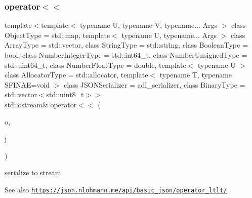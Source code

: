 \subsubsection{\texorpdfstring{operator$<$$<$}{operator<<}\hspace{0.1cm}{\footnotesize\ttfamily [1/2]}}
{\footnotesize\ttfamily template$<$template$<$ typename U, typename V, typename... Args $>$ class Object\+Type = std\+::map, template$<$ typename U, typename... Args $>$ class Array\+Type = std\+::vector, class String\+Type  = std\+::string, class Boolean\+Type  = bool, class Number\+Integer\+Type  = std\+::int64\+\_\+t, class Number\+Unsigned\+Type  = std\+::uint64\+\_\+t, class Number\+Float\+Type  = double, template$<$ typename U $>$ class Allocator\+Type = std\+::allocator, template$<$ typename T, typename S\+F\+I\+N\+A\+E=void $>$ class J\+S\+O\+N\+Serializer = adl\+\_\+serializer, class Binary\+Type  = std\+::vector$<$std\+::uint8\+\_\+t$>$$>$ \\
std\+::ostream\& operator$<$$<$ (\begin{DoxyParamCaption}\item[{std\+::ostream \&}]{o,  }\item[{const \hyperlink{classnlohmann_1_1basic__json}{basic\+\_\+json}$<$ Object\+Type, Array\+Type, String\+Type, Boolean\+Type, Number\+Integer\+Type, Number\+Unsigned\+Type, Number\+Float\+Type, Allocator\+Type, J\+S\+O\+N\+Serializer, Binary\+Type $>$ \&}]{j }\end{DoxyParamCaption})\hspace{0.3cm}{\ttfamily [friend]}}



serialize to stream 

\begin{DoxySeeAlso}{See also}
\href{https://json.nlohmann.me/api/basic_json/operator_ltlt/}{\tt https\+://json.\+nlohmann.\+me/api/basic\+\_\+json/operator\+\_\+ltlt/} 
\end{DoxySeeAlso}
\mbox{\label{classnlohmann_1_1basic__json_a60ca396028b8d9714c6e10efbf475af6}} 
